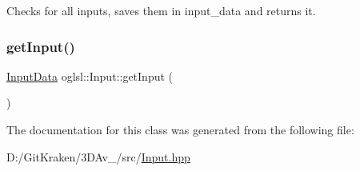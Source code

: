 Checks for all inputs, saves them in input\+\_\+data and returns it. 

\mbox{\label{classoglsl_1_1_input_aa4a0967baed81cd85c6ebdf65fef492a}} 
\subsubsection{\texorpdfstring{get\+Input()}{getInput()}}
{\footnotesize\ttfamily \mbox{\hyperlink{classoglsl_1_1_input_a3b21d7328538e661f366af5d6059c197}{Input\+Data}} oglsl\+::\+Input\+::get\+Input (\begin{DoxyParamCaption}{ }\end{DoxyParamCaption})\hspace{0.3cm}{\ttfamily [inline]}}



The documentation for this class was generated from the following file\+:\begin{DoxyCompactItemize}
\item 
D\+:/\+Git\+Kraken/3\+D\+Av\+\_/src/\mbox{\hyperlink{_input_8hpp}{Input.\+hpp}}\end{DoxyCompactItemize}
